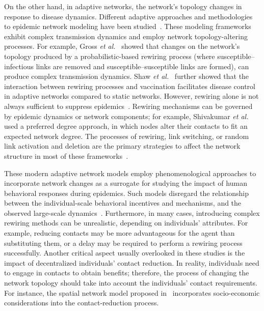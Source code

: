 \documentclass[9pt,twocolumn,twoside]{pnas-new}
\begin{document}
On the other hand, in adaptive networks, the network's topology changes in response to disease dynamics. Different adaptive approaches and methodologies to epidemic network modeling have been studied~\cite{Pastor15,Bansal10}.
These modeling frameworks exhibit complex transmission dynamics and employ network topology-altering processes. For example, Gross {\it et al.}~\cite{gross2006epidemic} showed that changes on the network's topology produced by a probabilistic-based rewiring process (where susceptible–infectious links are removed and susceptible–susceptible links are formed), can produce complex transmission dynamics. Shaw {\it et al.}~\cite{shaw2010enhanced} further showed that the interaction between rewiring processes and vaccination facilitates disease control in adaptive networks compared to static networks.
%
However, rewiring alone is not always sufficient to suppress epidemics~\cite{DONG2015169}. Rewiring mechanisms can be governed by epidemic dynamics or network components; for example, Shivakumar {\it et al.} \cite{Shivakumar12} used a preferred degree approach, in which nodes alter their contacts to fit an expected network degree.
%
The processes of rewiring, link switching, or random link activation and deletion are the primary strategies to affect the network structure in most of these frameworks~\cite{Zhu2019,Guo13,RISAUGUSMAN200952,Ball2022,Kiss2012,Ogura2017}.


These modern adaptive network models employ phenomenological approaches to incorporate network changes as a surrogate for studying the impact of human behavioral responses during epidemics. %
Such models disregard the relationship between the individual-scale behavioral incentives and mechanisms, 
and the observed large-scale dynamics~\cite{Bansal07, Kao2010}.
%
Furthermore, in many cases, introducing complex rewiring methods can be unrealistic, depending on individuals' attributes. For example, reducing contacts may be more advantageous for the agent than substituting them, or a delay may be required to perform a rewiring process~\cite{Li19} successfully. 
%
Another critical aspect usually overlooked in these studies %
is the impact of decentralized individuals' contact reduction. In reality, individuals need to engage in contacts to obtain benefits; therefore, the process of changing the network topology should take into account the individuals' contact requirements. For instance, the spatial network model proposed in~\cite{Maharaj12} incorporates socio-economic considerations into the contact-reduction process. 
\end{document}
